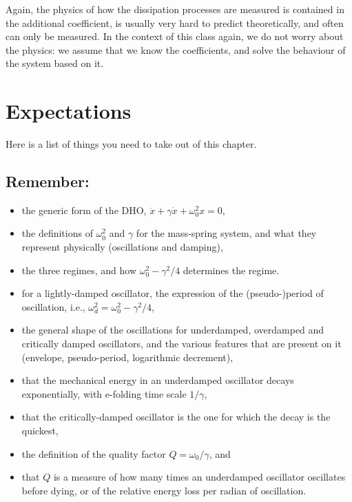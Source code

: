 \documentclass[11pt]{article}
\providecommand{\tightlist}{%
      \setlength{\itemsep}{0pt}\setlength{\parskip}{0pt}}
\begin{document}
Again, the physics of how the dissipation processes are measured is
contained in the additional coefficient, is usually very hard to predict
theoretically, and often can only be measured. In the context of this
class again, we do not worry about the physics: we assume that we know
the coefficients, and solve the behaviour of the system based on it.

    \hypertarget{expectations}{%
\section{Expectations}\label{expectations}}

Here is a list of things you need to take out of this chapter.

    \hypertarget{remember}{%
\subsection{Remember:}\label{remember}}

\begin{itemize}
\tightlist
\item
  the generic form of the DHO,
  \(\ddot x + \gamma \dot x + \omega_0^2x = 0\),
\item
  the definitions of \(\omega_0^2\) and \(\gamma\) for the mass-spring
  system, and what they represent physically (oscillations and damping),
\item
  the three regimes, and how \(\omega_0^2 - \gamma^2/4\) determines the
  regime.
\item
  for a lightly-damped oscillator, the expression of the (pseudo-)period
  of oscillation, i.e., \(\omega_d^2 = \omega_0^2 - \gamma^2/4\),
\item
  the general shape of the oscillations for underdamped, overdamped and
  critically damped oscillators, and the various features that are
  present on it (envelope, pseudo-period, logarithmic decrement),
\item
  that the mechanical energy in an underdamped oscillator decays
  exponentially, with e-folding time scale \(1/\gamma\),
\item
  that the critically-damped oscillator is the one for which the decay
  is the quickest,
\item
  the definition of the quality factor \(Q = \omega_0/\gamma\), and
\item
  that \(Q\) is a measure of how many times an underdamped oscillator
  oscillates before dying, or of the relative energy loss per radian of
  oscillation.
\end{itemize}
\end{document}
